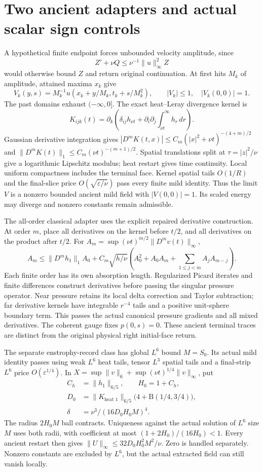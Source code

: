 \documentclass[11pt]{article}
\begin{document}
\section{Two ancient adapters and actual scalar sign controls}

A hypothetical finite endpoint forces unbounded velocity amplitude, since
\[
 Z'+\nu Q\le\nu^{-1}\|u\|_\infty^2Z
\]
would otherwise bound $Z$ and return original continuation. At first hits
$M_k$ of amplitude, attained maxima $x_k$ give
\[
 V_k(y,s)=M_k^{-1}u(x_k+y/M_k,t_k+s/M_k^2),\qquad
 |V_k|\le1,\quad |V_k(0,0)|=1.
\]
The past domains exhaust $(-\infty,0]$. The exact heat--Leray divergence
kernel is
\[
 K_{ijk}(t)=\partial_k\left(\delta_{ij}h_{\nu t}
       +\partial_i\partial_j\int_{\nu t}^\infty h_r\,dr\right).
\]
Gaussian derivative integration gives $|D^mK(t,x)|\le
C_m(|x|^2+\nu t)^{-(4+m)/2}$ and
$\|D^mK(t)\|_1\le C_m(\nu t)^{-(m+1)/2}$.
Spatial translations split at $\tau=|z|^2/\nu$ give a logarithmic
Lipschitz modulus; heat restart gives time continuity. Local uniform
compactness includes the terminal face. Kernel spatial tails $O(1/R)$
and the final-slice price $O(\sqrt{\varepsilon/\nu})$ pass every finite
mild identity. Thus the limit $V$ is a nonzero bounded ancient mild field
with $|V(0,0)|=1$. Its scaled energy may diverge and nonzero constants
remain admissible.

The all-order classical adapter uses the explicit repaired derivative
construction. At order $m$, place all derivatives on the kernel before
$t/2$, and all derivatives on the product after $t/2$. For
$A_m=\sup(\nu t)^{m/2}\|D^mv(t)\|_\infty$,
\[
 A_m\le\|D^mh_1\|_1A_0+C_m\sqrt{h/\nu}
 \left(A_0^2+A_0A_m+\sum_{1\le j<m}A_jA_{m-j}\right).
\]
Each finite order has its own absorption length. Regularized Picard iterates
and finite differences construct derivatives before passing the singular
pressure operator. Near pressure retains its local delta correction and
Taylor subtraction; far derivative kernels have integrable $r^{-4}$ tails
and a positive unit-sphere boundary term. This passes the actual canonical
pressure gradients and all mixed derivatives. The coherent gauge fixes
$p(0,s)=0$. These ancient terminal traces are distinct from the original
physical right initial-face return.

The separate enstrophy-record class has global $L^6$ bound $M=S_0$.
Its actual mild identity passes using weak $L^6$ heat tails, tensor $L^3$
spatial tails and a final-strip $L^6$ price $O(\varepsilon^{1/4})$.
In $X=\sup\|v\|_6+\sup(\nu t)^{1/4}\|v\|_\infty$, put
\[
 \begin{aligned}
 C_h&=\|h_1\|_{6/5},\qquad H_0=1+C_h,\\
 D_0&=\|K_{\text{heat }1}\|_{6/5}
                  \bigl(4+\mathrm B(1/4,3/4)\bigr),\\
 \delta&=\nu^3/(16D_0H_0M)^4.
 \end{aligned}
\]
The radius $2H_0M$ ball contracts. Uniqueness against the actual solution
of $L^6$ size $M$ uses both radii, with coefficient at most
$(1+2H_0)/(16H_0)<1$. Every ancient restart then gives
$\|U\|_\infty\le32D_0H_0^2M^2/\nu$.
Zero is handled separately. Nonzero constants are excluded by $L^6$,
but the actual extracted field can still vanish locally.
\end{document}
